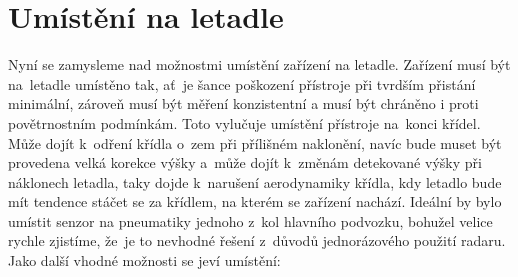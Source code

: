 	\section{Umístění na letadle}\label{navrhReseni::umisteniNaLetadle}
		Nyní se zamysleme nad možnostmi umístění zařízení na letadle. Zařízení musí být na~letadle umístěno tak, ať~je šance poškození přístroje při tvrdším přistání minimální, zároveň musí být měření konzistentní a musí být chráněno i proti povětrnostním podmínkám. Toto vylučuje umístění přístroje na~konci křídel. Může dojít k~odření křídla o~zem při přílišném naklonění, navíc bude muset být provedena velká korekce výšky a~může dojít k~změnám detekované výšky při náklonech letadla, taky dojde k~narušení aerodynamiky křídla, kdy letadlo bude mít tendence stáčet se za křídlem, na kterém se zařízení nachází. Ideální by bylo umístit senzor na pneumatiky jednoho z~kol hlavního podvozku, bohužel velice rychle zjistíme, že~je to nevhodné řešení z~důvodů jednorázového použití radaru. Jako další vhodné možnosti se jeví umístění:
